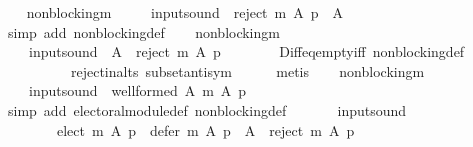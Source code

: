 \begin{isabellebody}
\ \ \isamarkupfalse%
\ non{\isacharunderscore}{\kern0pt}blocking{\isacharunderscore}{\kern0pt}m\ \isamarkupfalse%
\isanewline
\ \ \ \ {\isachardoublequoteopen}{\isacharquery}{\kern0pt}input{\isacharunderscore}{\kern0pt}sound\ {\isasymlongrightarrow}\ reject\ m\ A\ p\ {\isasymnoteq}\ A{\isachardoublequoteclose}\isanewline
\ \ \ \ \isamarkupfalse%
\ {\isacharparenleft}{\kern0pt}simp\ add{\isacharcolon}{\kern0pt}\ non{\isacharunderscore}{\kern0pt}blocking{\isacharunderscore}{\kern0pt}def{\isacharparenright}{\kern0pt}\isanewline
\ \ \isamarkupfalse%
\ non{\isacharunderscore}{\kern0pt}blocking{\isacharunderscore}{\kern0pt}m\ \isamarkupfalse%
\ {}{\isacharcolon}{\kern0pt}\isanewline
\ \ \ \ {\isachardoublequoteopen}{\isacharquery}{\kern0pt}input{\isacharunderscore}{\kern0pt}sound\ {\isasymlongrightarrow}\ A\ {\isacharminus}{\kern0pt}\ reject\ m\ A\ p\ {\isasymnoteq}\ {\isacharbraceleft}{\kern0pt}{\isacharbraceright}{\kern0pt}{\isachardoublequoteclose}\isanewline
\ \ \ \ \isamarkupfalse%
\ Diff{\isacharunderscore}{\kern0pt}eq{\isacharunderscore}{\kern0pt}empty{\isacharunderscore}{\kern0pt}iff\ non{\isacharunderscore}{\kern0pt}blocking{\isacharunderscore}{\kern0pt}def\isanewline
\ \ \ \ \ \ \ \ \ \ reject{\isacharunderscore}{\kern0pt}in{\isacharunderscore}{\kern0pt}alts\ subset{\isacharunderscore}{\kern0pt}antisym\isanewline
\ \ \ \ \isamarkupfalse%
\ metis\isanewline
\ \ \isamarkupfalse%
\ non{\isacharunderscore}{\kern0pt}blocking{\isacharunderscore}{\kern0pt}m\ \isamarkupfalse%
\isanewline
\ \ \ \ {\isachardoublequoteopen}{\isacharquery}{\kern0pt}input{\isacharunderscore}{\kern0pt}sound\ {\isasymlongrightarrow}\ well{\isacharunderscore}{\kern0pt}formed\ A\ {\isacharparenleft}{\kern0pt}m\ A\ p{\isacharparenright}{\kern0pt}{\isachardoublequoteclose}\isanewline
\ \ \ \ \isamarkupfalse%
\ {\isacharparenleft}{\kern0pt}simp\ add{\isacharcolon}{\kern0pt}\ electoral{\isacharunderscore}{\kern0pt}module{\isacharunderscore}{\kern0pt}def\ non{\isacharunderscore}{\kern0pt}blocking{\isacharunderscore}{\kern0pt}def{\isacharparenright}{\kern0pt}\isanewline
\ \ \isamarkupfalse%
\isanewline
\ \ \ \ {\isachardoublequoteopen}{\isacharquery}{\kern0pt}input{\isacharunderscore}{\kern0pt}sound\ {\isasymlongrightarrow}\isanewline
\ \ \ \ \ \ \ \ elect\ m\ A\ p\ {\isasymunion}\ defer\ m\ A\ p\ {\isacharequal}{\kern0pt}\ A\ {\isacharminus}{\kern0pt}\ reject\ m\ A\ p{\isachardoublequoteclose}\isanewline

\end{isabellebody}
